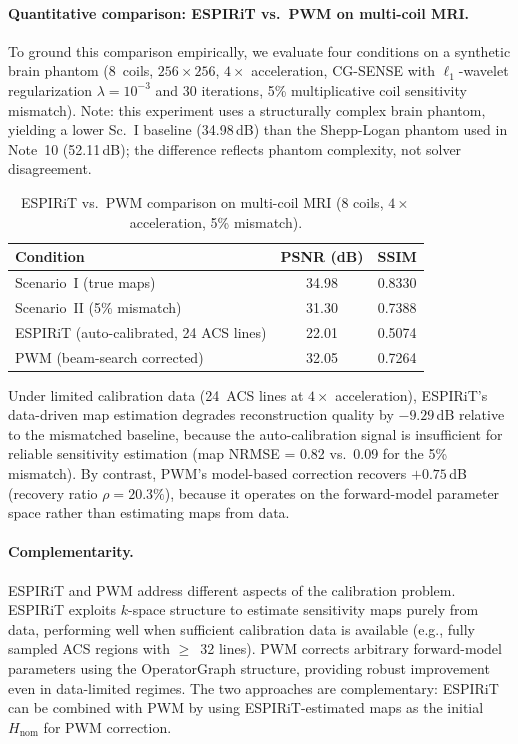 \documentclass[11pt]{article}
\theoremstyle{definition}
\begin{document}
\paragraph{Quantitative comparison: ESPIRiT vs.\ PWM on multi-coil MRI.}
To ground this comparison empirically, we evaluate four conditions on a synthetic brain phantom (8~coils, $256 \times 256$, $4\times$ acceleration, CG-SENSE with $\ell_1$-wavelet regularization $\lambda = 10^{-3}$ and 30 iterations, 5\% multiplicative coil sensitivity mismatch).  Note: this experiment uses a structurally complex brain phantom, yielding a lower Sc.~I baseline (34.98\,dB) than the Shepp-Logan phantom used in Note~10 (52.11\,dB); the difference reflects phantom complexity, not solver disagreement.

\begin{table}[ht]
\centering\small
\caption{ESPIRiT vs.\ PWM comparison on multi-coil MRI (8 coils, $4\times$ acceleration, 5\% mismatch).}
\label{tab:espirit_comparison}
\begin{tabular}{@{}lcc@{}}
\toprule
Condition & PSNR (dB) & SSIM \\
\midrule
Scenario~I (true maps) & 34.98 & 0.8330 \\
Scenario~II (5\% mismatch) & 31.30 & 0.7388 \\
ESPIRiT (auto-calibrated, 24 ACS lines) & 22.01 & 0.5074 \\
PWM (beam-search corrected) & 32.05 & 0.7264 \\
\bottomrule
\end{tabular}
\end{table}

\noindent Under limited calibration data (24~ACS lines at $4\times$ acceleration), ESPIRiT's data-driven map estimation degrades reconstruction quality by $-9.29$\,dB relative to the mismatched baseline, because the auto-calibration signal is insufficient for reliable sensitivity estimation (map NRMSE = 0.82 vs.\ 0.09 for the 5\% mismatch). By contrast, PWM's model-based correction recovers $+0.75$\,dB (recovery ratio $\rho = 20.3\%$), because it operates on the forward-model parameter space rather than estimating maps from data.

\paragraph{Complementarity.} ESPIRiT and PWM address different aspects of the calibration problem. ESPIRiT exploits $k$-space structure to estimate sensitivity maps purely from data, performing well when sufficient calibration data is available (e.g., fully sampled ACS regions with $\geq$~32 lines). PWM corrects arbitrary forward-model parameters using the OperatorGraph structure, providing robust improvement even in data-limited regimes. The two approaches are complementary: ESPIRiT can be combined with PWM by using ESPIRiT-estimated maps as the initial $H_{\mathrm{nom}}$ for PWM correction.
\end{document}
